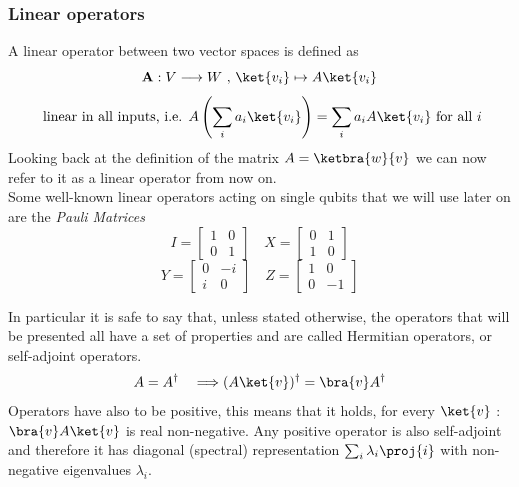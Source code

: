 	\subsubsection*{Linear operators}
	A linear operator between two vector spaces is defined as 
	$$ \mathbf{A}: V\longrightarrow W \text{  ,  }\ket{v_i}\mapsto A\ket{v_i}$$
	$$ \text{ linear in all inputs, i.e.  }  A\left( \sum_i a_i\ket{v_i}\right) = \sum_i a_i A\ket{v_i} \text{  for all } i $$ 
	Looking back at the definition of the matrix $ A = \ketbra{w}{v}$ we can now refer to it as a linear operator from now on. \\
	Some well-known linear operators acting on single qubits that we will use later on are the \textit{Pauli Matrices}
	$$ I = \begin{bmatrix} 1 & 0 \\ 0 & 1 \end{bmatrix}	 \quad   X = \begin{bmatrix} 0 & 1 \\ 1 & 0 \end{bmatrix}$$
	$$ Y= \begin{bmatrix} 0 & -i \\ i & 0 \end{bmatrix}	 \quad   Z = \begin{bmatrix} 1 & 0 \\ 0 & -1 \end{bmatrix}$$
	
	In particular it is safe to say that, unless stated otherwise, the operators that will be presented all have a set of properties and are called Hermitian operators, or self-adjoint operators.\\
	$$ A = A^{\dagger} \quad \Longrightarrow (A\ket{v})^{\dagger} = \bra{v}A^{\dagger} $$ 
	Operators have also to be positive, this means that it holds, for every $\ket{v}$ : $\bra{v}A\ket{v}$ is real non-negative. Any positive operator is also self-adjoint and therefore it has diagonal (spectral) representation $\sum_i \lambda_i \proj{i}$ with non-negative eigenvalues $\lambda_i$.\\
	
